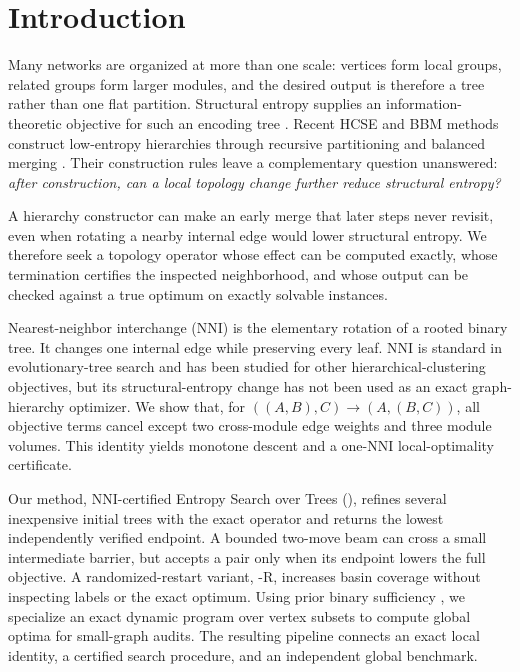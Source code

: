 \section{Introduction}
Many networks are organized at more than one scale: vertices form local
groups, related groups form larger modules, and the desired output is therefore
a tree rather than one flat partition. Structural entropy supplies an
information-theoretic objective for such an encoding tree \cite{li2016}.
Recent HCSE and BBM methods construct low-entropy hierarchies through recursive
partitioning and balanced merging \cite{pan2025}. Their construction rules
leave a complementary question unanswered: \emph{after construction, can a
local topology change further reduce structural entropy?}

A hierarchy constructor can make an early merge that later steps never revisit,
even when rotating a nearby internal edge would lower structural entropy. We
therefore seek a topology operator whose effect can be computed exactly, whose
termination certifies the inspected neighborhood, and whose output can be
checked against a true optimum on exactly solvable instances.

Nearest-neighbor interchange (NNI) is the elementary rotation of a rooted
binary tree. It changes one internal edge while preserving every leaf. NNI is
standard in evolutionary-tree search and has been studied for other
hierarchical-clustering objectives, but its structural-entropy change has not
been used as an exact graph-hierarchy optimizer. We show that, for
$((A,B),C)\rightarrow(A,(B,C))$, all objective terms cancel except two
cross-module edge weights and three module volumes. This identity yields
monotone descent and a one-NNI local-optimality certificate.

Our method, NNI-certified Entropy Search over Trees (\NEST), refines several
inexpensive initial trees with the exact operator and returns the lowest
independently verified endpoint. A bounded two-move beam can cross a small
intermediate barrier, but accepts a pair only when its endpoint lowers the full
objective. A randomized-restart variant, \NEST-R, increases basin coverage
without inspecting labels or the exact optimum. Using prior binary sufficiency
\cite{zhang2021supertad,pan2025}, we specialize an exact dynamic program over
vertex subsets to compute global optima for small-graph audits. The resulting
pipeline connects an exact local identity, a certified search procedure, and
an independent global benchmark.

